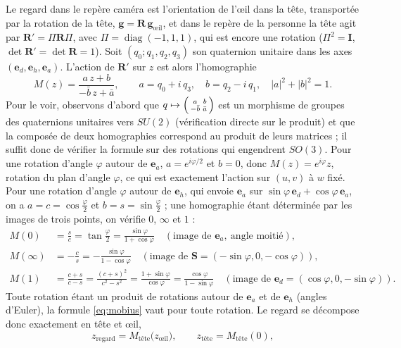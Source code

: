 \documentclass[10pt,a4paper]{article}
\newcommand{\vect}[1]{\symbf{#1}}
\begin{document}
Le regard dans le repère caméra est l'orientation de l'œil dans la tête, transportée par la rotation de la tête, $\vect g=\mathbf R\,\vect g_{\text{œil}}$, et dans le repère de la personne la tête agit par $\mathbf R'=\Pi\mathbf R\Pi$, avec $\Pi=\operatorname{diag}(-1,1,1)$, qui est encore une rotation ($\Pi^2=\mathbf I$, $\det\mathbf R'=\det\mathbf R=1$). Soit $(q_0;q_1,q_2,q_3)$ son quaternion unitaire dans les axes $(\vect e_d,\vect e_h,\vect e_a)$. L'action de $\mathbf R'$ sur $z$ est alors l'homographie
\begin{equation}\label{eq:mobius}
M(z)=\frac{a\,z+b}{-\bar b\,z+\bar a},\qquad a=q_0+i\,q_3,\quad b=q_2-i\,q_1,\quad |a|^2+|b|^2=1 .
\end{equation}
Pour le voir, observons d'abord que $q\mapsto\begin{psmallmatrix}a&b\\-\bar b&\bar a\end{psmallmatrix}$ est un morphisme de groupes des quaternions unitaires vers $SU(2)$ (vérification directe sur le produit) et que la composée de deux homographies correspond au produit de leurs matrices ; il suffit donc de vérifier la formule sur des rotations qui engendrent $SO(3)$. Pour une rotation d'angle $\varphi$ autour de $\vect e_a$, $a=e^{i\varphi/2}$ et $b=0$, donc $M(z)=e^{i\varphi}z$, rotation du plan d'angle $\varphi$, ce qui est exactement l'action sur $(u,v)$ à $w$ fixé. Pour une rotation d'angle $\varphi$ autour de $\vect e_h$, qui envoie $\vect e_a$ sur $\sin\varphi\,\vect e_d+\cos\varphi\,\vect e_a$, on a $a=c=\cos\frac\varphi2$ et $b=s=\sin\frac\varphi2$ ; une homographie étant déterminée par les images de trois points, on vérifie $0$, $\infty$ et $1$ :
\begin{align*}
M(0)&=\tfrac{s}{c}=\tan\tfrac\varphi2=\tfrac{\sin\varphi}{1+\cos\varphi}\quad(\text{image de }\vect e_a,\ \text{angle moitié}),\\
M(\infty)&=-\tfrac{c}{s}=-\tfrac{\sin\varphi}{1-\cos\varphi}\quad(\text{image de }\vect S=(-\sin\varphi,0,-\cos\varphi)),\\
M(1)&=\tfrac{c+s}{c-s}=\tfrac{(c+s)^2}{c^2-s^2}=\tfrac{1+\sin\varphi}{\cos\varphi}=\tfrac{\cos\varphi}{1-\sin\varphi}\quad(\text{image de }\vect e_d=(\cos\varphi,0,-\sin\varphi)).
\end{align*}
Toute rotation étant un produit de rotations autour de $\vect e_a$ et de $\vect e_h$ (angles d'Euler), la formule \eqref{eq:mobius} vaut pour toute rotation. Le regard se décompose donc exactement en tête et œil,
\begin{equation}
z_{\text{regard}}=M_{\text{tête}}\bigl(z_{\text{œil}}\bigr),\qquad z_{\text{tête}}=M_{\text{tête}}(0),
\end{equation}
\end{document}
